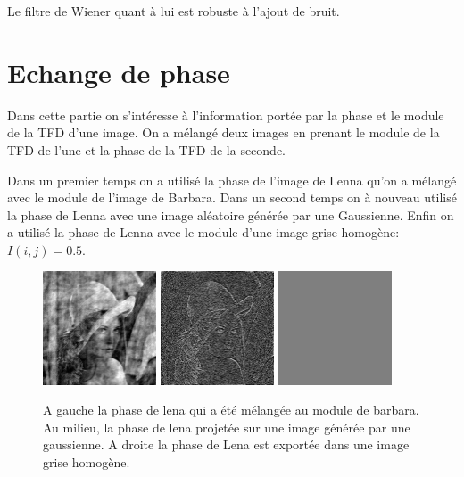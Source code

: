 \documentclass{article}
\begin{document}
Le filtre de Wiener quant à lui est robuste à l'ajout de bruit.

\section{Echange de phase}

Dans cette partie on s'intéresse à l'information portée par la phase et le module de la TFD d'une image. On a mélangé deux images en prenant le module de la TFD de l'une et la phase de la TFD de la seconde.

Dans un premier temps on a utilisé la phase de l'image de Lenna qu'on a mélangé avec le module de l'image de Barbara. Dans un second temps on à nouveau utilisé la phase de Lenna avec une image aléatoire générée par une Gaussienne. Enfin on a utilisé la phase de Lenna avec le module d'une image grise homogène: $I(i,j) = 0.5$.

\begin{figure}[h]
	\includegraphics[width=0.3\textwidth]{phase_swapping.jpg}
	\includegraphics[width=0.3\textwidth]{phase_swapping_in_random.jpg}
		\includegraphics[width=0.3\textwidth]{phase_swapping_in_grey_image.jpg}

  \caption{A gauche la phase de lena qui a été mélangée au module de barbara. Au milieu, la phase de lena projetée sur une image générée par une gaussienne. A droite la phase de Lena est exportée dans une image grise homogène.}
  
\end{figure}
\end{document}
